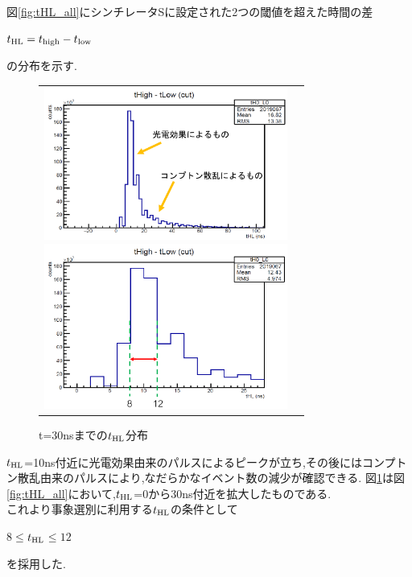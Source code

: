 図\ref{fig:tHL_all}にシンチレータSに設定された2つの閾値を超えた時間の差\\
\begin{center}
	$t_{\rm HL}=t_{\rm high}-t_{\rm low}$
\end{center}
の分布を示す.
\begin{figure}[htbp]
	\begin{tabular}{cc}
		\begin{minipage}{0.5\hsize}
			\begin{center}
				\includegraphics[width=80mm]{fig/isb/tHL.pdf}
				\caption{$t_{\rm HL}$の分布}
				\label{fig:tHL_all}
			\end{center}
		\end{minipage}
		\begin{minipage}{0.5\hsize}
			\begin{center}
				\includegraphics[width=80mm]{fig/isb/tHL_cut.pdf}
				\caption{t=30nsまでの$t_{\rm HL}$分布}
				\label{fig:tHL_zoom}
			\end{center}
		\end{minipage}
	\end{tabular}
\end{figure}

$t_{\rm HL}$=10ns付近に光電効果由来のパルスによるピークが立ち,その後にはコンプトン散乱由来のパルスにより,なだらかなイベント数の減少が確認できる.
図\ref{fig:tHL_zoom}は図\ref{fig:tHL_all}において,$t_{\rm HL}$=0から30ns付近を拡大したものである.\\
これより事象選別に利用する$t_{\rm HL}$の条件として\\
\begin{center}
	$8\leq$$t_{\rm HL}$$\leq12$
\end{center}
を採用した.

